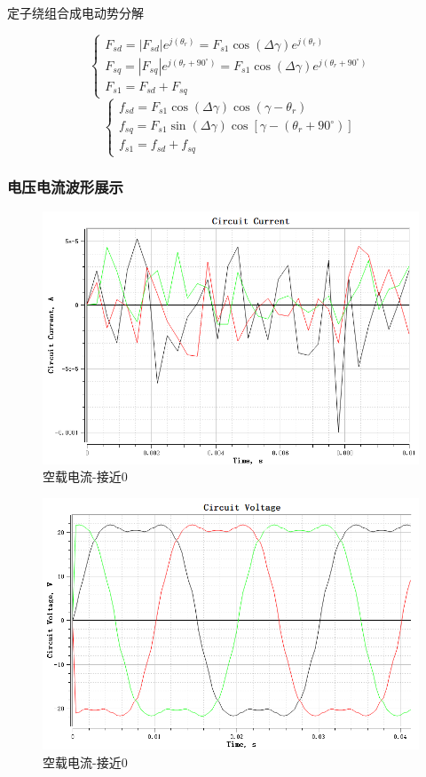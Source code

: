 \documentclass{thuemp}
\begin{document}
定子绕组合成电动势分解

$$\left.\left\{\begin{array}{l}F_{sd}=|F_{sd}|e^{j(\theta_r)}=F_{s1}\cos(\Delta\gamma)e^{j(\theta_r)}\\F_{sq}=|F_{sq}|e^{j(\theta_r+90^{\circ})}=F_{s1}\cos(\Delta\gamma)e^{j(\theta_r+90^{\circ})}\\F_{s1}=F_{sd}+F_{sq}\end{array}\right.\right.$$
$$\left.\left\{\begin{array}{l}f_{sd}=F_{s1}\cos(\Delta\gamma)\cos{(\gamma-\theta_r)}\\f_{sq}=F_{s1}\sin(\Delta\gamma)\cos{[\gamma-(\theta_r+90^\circ)]}\\f_{s1}=f_{sd}+f_{sq}\end{array}\right.\right.$$

\subsubsection{电压电流波形展示}
\begin{figure}[H]
  \centering
  \includegraphics[width=1\linewidth]{./img/task1/noload-current.png}
  \caption{空载电流-接近0}
\end{figure}

\begin{figure}[H]
  \centering
  \includegraphics[width=1\linewidth]{./img/task1/noload-voltage.png}
  \caption{空载电流-接近0}
\end{figure}
\end{document}
